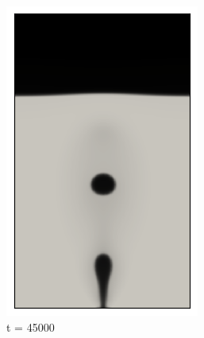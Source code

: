 \begin{figure}[H]
\begin{subfigure}{0.25\textwidth}
		\includegraphics[width=\linewidth]{figs/cap4/cuda_bb_760_d45}
		\caption{t = 45000}
		\label{fig:8}
	\end{subfigure}\hfil 
	\begin{subfigure}{0.25\textwidth}

\end{subfigure}
\end{figure}
